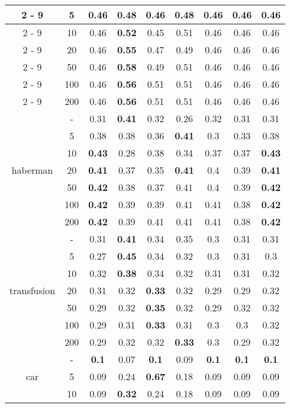 \documentclass{article}%
\begin{document}
\begin{longtable}{c|c|ccccccc}
\cline{2%
-%
9}%
&5&0.46&\textbf{0.48}&0.46&\textbf{0.48}&0.46&0.46&0.46\\%
\cline{2%
-%
9}%
&10&0.46&\textbf{0.52}&0.45&0.51&0.46&0.46&0.46\\%
\cline{2%
-%
9}%
&20&0.46&\textbf{0.55}&0.47&0.49&0.46&0.46&0.46\\%
\cline{2%
-%
9}%
&50&0.46&\textbf{0.58}&0.49&0.51&0.46&0.46&0.46\\%
\cline{2%
-%
9}%
&100&0.46&\textbf{0.56}&0.51&0.51&0.46&0.46&0.46\\%
\cline{2%
-%
9}%
&200&0.46&\textbf{0.56}&0.51&0.51&0.46&0.46&0.46\\%
\hline%
\multirow{7}{*}{haberman}&{-}&0.31&\textbf{0.41}&0.32&0.26&0.32&0.31&0.31\\%
\cline{2%
-%
9}%
&5&0.38&0.38&0.36&\textbf{0.41}&0.3&0.33&0.38\\%
\cline{2%
-%
9}%
&10&\textbf{0.43}&0.28&0.38&0.34&0.37&0.37&\textbf{0.43}\\%
\cline{2%
-%
9}%
&20&\textbf{0.41}&0.37&0.35&\textbf{0.41}&0.4&0.39&\textbf{0.41}\\%
\cline{2%
-%
9}%
&50&\textbf{0.42}&0.38&0.37&0.41&0.4&0.39&\textbf{0.42}\\%
\cline{2%
-%
9}%
&100&\textbf{0.42}&0.39&0.39&0.41&0.41&0.38&\textbf{0.42}\\%
\cline{2%
-%
9}%
&200&\textbf{0.42}&0.39&0.41&0.41&0.41&0.38&\textbf{0.42}\\%
\hline%
\multirow{7}{*}{transfusion}&{-}&0.31&\textbf{0.41}&0.34&0.35&0.3&0.31&0.31\\%
\cline{2%
-%
9}%
&5&0.27&\textbf{0.45}&0.34&0.32&0.3&0.31&0.3\\%
\cline{2%
-%
9}%
&10&0.32&\textbf{0.38}&0.34&0.32&0.31&0.31&0.32\\%
\cline{2%
-%
9}%
&20&0.31&0.32&\textbf{0.33}&0.32&0.29&0.29&0.32\\%
\cline{2%
-%
9}%
&50&0.29&0.32&\textbf{0.35}&0.32&0.29&0.32&0.32\\%
\cline{2%
-%
9}%
&100&0.29&0.31&\textbf{0.33}&0.31&0.3&0.3&0.32\\%
\cline{2%
-%
9}%
&200&0.29&0.32&0.32&\textbf{0.33}&0.3&0.29&0.32\\%
\hline%
\multirow{7}{*}{car}&{-}&\textbf{0.1}&0.07&\textbf{0.1}&0.09&\textbf{0.1}&\textbf{0.1}&\textbf{0.1}\\%
\cline{2%
-%
9}%
&5&0.09&0.24&\textbf{0.67}&0.18&0.09&0.09&0.09\\%
\cline{2%
-%
9}%
&10&0.09&\textbf{0.32}&0.24&0.18&0.09&0.09&0.09\\%

\end{longtable}
\end{document}
